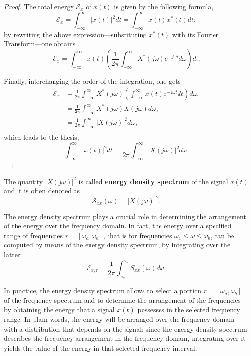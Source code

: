 \documentclass[\documentfontsize, twocolumn]{\classname}
\begin{document}
\begin{proof}
The total energy $\mathcal E_x$ of $x(t)$ is given by the following formula,
\[
    \mathcal E_x = \int_{-\infty}^\infty |x(t)|^2dt = \int_{-\infty}^\infty x(t)x^*(t)dt;
\]
by rewriting the above expression---substituting $x^*(t)$ with its Fourier Transform---one obtains
\[
    \mathcal E_x = \int_{-\infty}^\infty x(t)\left(\frac{1}{2\pi}\int_{-\infty}^\infty X^* (j\omega) e^{-j\omega t} d\omega \right) dt.
\]

Finally, interchanging the order of the integration, one gets
\begin{align*}
    \mathcal E_x &= \frac{1}{2\pi}\int_{-\infty}^\infty X^*(j\omega)\left(\int_{-\infty}^\infty x (t) e^{-j\omega t} dt \right) d\omega,\\
                 &= \frac{1}{2\pi}\int_{-\infty}^\infty X^*(j\omega)X(j\omega) d\omega,\\
                 &= \frac{1}{2\pi}\int_{-\infty}^\infty \left|X(j\omega)\right|^2 d\omega,\\
\end{align*}
which leads to the thesis,
\[
        \int_{-\infty}^\infty|x(t)|^2dt = \frac 1 {2\pi} \int_{-\infty}^\infty\left|X(j\omega)\right|^2 d\omega.
\]
\end{proof}

The quantity $\left|X(j\omega)\right|^2$ is called \textbf{energy density spectrum} of the signal $x(t)$ and it is often denoted as
\begin{equation}\label{eqn:energyDensitySpectrum}
    \mathcal S_{xx}(\omega)=\left|X(j\omega)\right|^2.
\end{equation}

The energy density spectrum plays a crucial role in determining the arrangement of the energy over the frequency domain. In fact, the energy over a specified range of frequencies $r = [\omega_a, \omega_b]$, that is for frequencies $\omega_a \leq \omega \leq \omega_b$, can be computed by means of the energy density spectrum, by integrating over the latter:
\begin{equation}\label{eqn:energyDensitySpectrumComputation}
    \mathcal E_{x,r} = \frac 1 {2\pi} \int_{\omega_a}^{\omega_b} S_{xx}(\omega)d\omega.
\end{equation}

In practice, the energy density spectrum allows to select a portion $r = [\omega_a, \omega_b]$ of the frequency spectrum and to determine the arrangement of the frequencies by obtaining the energy that a signal $x(t)$ possesses in the selected frequency range. In plain words, the energy will be arranged over the frequency domain with a distribution that depends on the signal; since the energy density spectrum describes the frequency arrangement in the frequency domain, integrating over it yields the value of the energy in that selected frequency interval.
\end{document}
